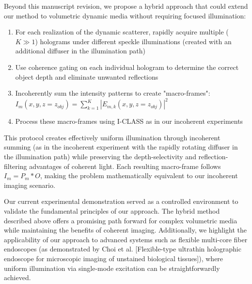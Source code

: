 \documentclass[12pt]{article}
\newenvironment{ourresponse}
    {\begin{tcolorbox}[width=\linewidth,breakable,enhanced,colback=gray!5,colframe=responsecolor!50,title=Response,left=5pt,right=5pt]}
    {\end{tcolorbox}}
\begin{document}
\begin{enumerate}[label=\arabic*.]
\begin{ourresponse}
    Beyond this manuscript revision, we propose a hybrid approach that could extend our method to volumetric dynamic media without requiring focused illumination:
    \begin{enumerate}
        \item For each realization of the dynamic scatterer, rapidly acquire multiple ($K \gg 1$) holograms under different speckle illuminations (created with an additional diffuser in the illumination path)
        \item Use coherence gating on each individual hologram to determine the correct object depth and eliminate unwanted reflections
        \item Incoherently sum the intensity patterns to create "macro-frames": $I_m(x,y,z=z_{obj}) = \sum_{k=1}^{K}|E_{m,k}(x,y,z=z_{obj})|^2$ 
        \item Process these macro-frames using I-CLASS as in our incoherent experiments
    \end{enumerate}
    
    This protocol creates effectively uniform illumination through incoherent summing (as in the incoherent experiment with the rapidly rotating diffuser in the illumination path) while preserving the depth-selectivity and reflection-filtering advantages of coherent light. Each resulting macro-frame follows $I_m = P_m * O$, making the problem mathematically equivalent to our incoherent imaging scenario.
    
    Our current experimental demonstration served as a controlled environment to validate the fundamental principles of our approach. The hybrid method described above offers a promising path forward for complex volumetric media while maintaining the benefits of coherent imaging. Additionally, we highlight the applicability of our approach to advanced systems such as flexible multi-core fiber endoscopes (as demonstrated by Choi et al. [Flexible-type ultrathin holographic endoscope for microscopic imaging of unstained biological tissues]), where uniform illumination via single-mode excitation can be straightforwardly achieved.
    \end{ourresponse}







\end{enumerate}
\end{document}
